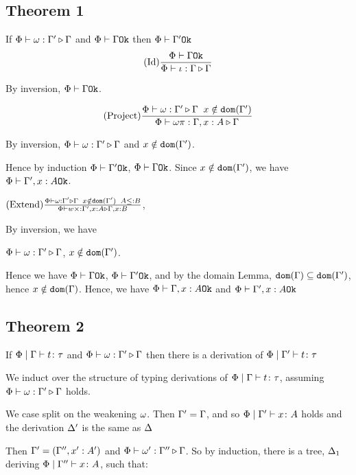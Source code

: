 {    \subsection{Theorem 1}
    If $\Phi\vdash \omega : \Gamma' \triangleright \Gamma$ and $\Phi\vdash \Gamma \texttt{Ok}$ then $\Phi\vdash \Gamma' \texttt{Ok}$
    \proof
    $$(\text{Id}) \frac{\Phi\vdash \Gamma \texttt{Ok}}{\Phi\vdash \iota : \Gamma \triangleright \Gamma}$$

    By inversion, $\Phi\vdash \Gamma \texttt{Ok}$.

    $$(\text{Project}) \frac{\Phi\vdash \omega : \Gamma' \triangleright \Gamma\;\; x \notin \texttt{dom}(\Gamma')}{\Phi\vdash \omega \pi : \Gamma, x: A \triangleright \Gamma}$$

    By inversion, $\Phi\vdash \omega : \Gamma' \triangleright \Gamma$ and $x\notin \texttt{dom}(\Gamma')$.

    Hence by induction $\Phi\vdash \Gamma' \texttt{Ok}$, $\Phi\vdash \Gamma \texttt{Ok}$. Since $x\notin\texttt{dom}(\Gamma')$, we have $\Phi\vdash \Gamma', x:A \texttt{Ok}$.

    $(\text{Extend}) \frac{\Phi\vdash \omega : \Gamma' \triangleright \Gamma\;\; x \notin \texttt{dom}(\Gamma')\;\; A \leq: B}{\Phi\vdash w \times : \Gamma', x: A \triangleright \Gamma, x: B}$, 

    By inversion, we have 

    $\Phi\vdash \omega : \Gamma' \triangleright \Gamma$, $x\notin\texttt{dom}(\Gamma')$.

    Hence we have $\Phi\vdash \Gamma \texttt{Ok}$, $\Phi\vdash \Gamma' \texttt{Ok}$, and by the domain Lemma, $\texttt{dom}(\Gamma)\subseteq\texttt{dom}(\Gamma')$, hence $x\notin\texttt{dom}(\Gamma)$. Hence, we have $\Phi\vdash \Gamma, x: A \texttt{Ok}$ and $\Phi\vdash \Gamma',x:A \texttt{Ok}$


    \subsection{Theorem 2}
    If $\Phi\mid\Gamma \vdash t \colon \tau$ and $\Phi\vdash \omega : \Gamma' \triangleright \Gamma$ then there is a derivation of $\Phi\mid\Gamma' \vdash t \colon \tau$

    \proof

    We induct over the structure of typing derivations of $\Phi\mid\Gamma \vdash t \colon \tau$, assuming $\Phi\vdash \omega : \Gamma' \triangleright \Gamma$ holds.

        We case split on the weakening $\omega$.
        \subcase{$\w = \i$}
        Then $\Gamma' = \Gamma$, and so $\Phi\mid\Gamma' \vdash x \colon A$ holds and the derivation $\Delta'$ is the same as $\Delta$


        Then  $\Gamma' = (\Gamma'',x': A')$ and $\Phi\vdash \omega' : \Gamma'' \triangleright \Gamma$. So by induction, there is a tree, $\Delta_1$ deriving $\Phi\mid\Gamma'' \vdash x \colon A$,  such that:
        
}
